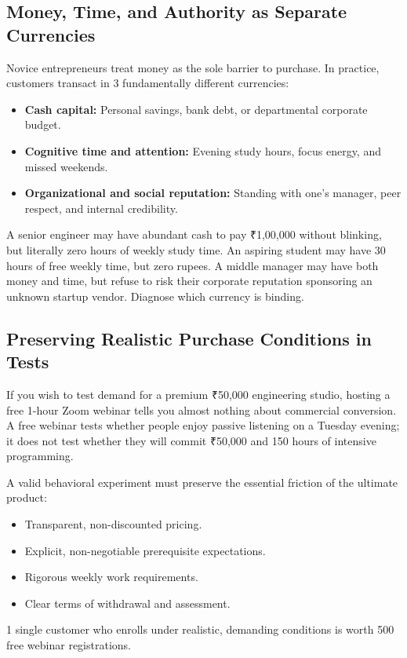 \subsection{Money, Time, and Authority as Separate Currencies}

Novice entrepreneurs treat money as the sole barrier to purchase. In practice, customers transact in 3 fundamentally different currencies:
\begin{itemize}[leftmargin=1.2em,itemsep=0.2ex]
  \item \textbf{Cash capital:} Personal savings, bank debt, or departmental corporate budget.
  \item \textbf{Cognitive time and attention:} Evening study hours, focus energy, and missed weekends.
  \item \textbf{Organizational and social reputation:} Standing with one's manager, peer respect, and internal credibility.
\end{itemize}

A senior engineer may have abundant cash to pay ₹1,00,000 without blinking, but literally zero hours of weekly study time. An aspiring student may have 30 hours of free weekly time, but zero rupees. A middle manager may have both money and time, but refuse to risk their corporate reputation sponsoring an unknown startup vendor. Diagnose which currency is binding.

\subsection{Preserving Realistic Purchase Conditions in Tests}

If you wish to test demand for a premium ₹50,000 engineering studio, hosting a free 1-hour Zoom webinar tells you almost nothing about commercial conversion. A free webinar tests whether people enjoy passive listening on a Tuesday evening; it does not test whether they will commit ₹50,000 and 150 hours of intensive programming.

A valid behavioral experiment must preserve the essential friction of the ultimate product:
\begin{itemize}[leftmargin=1.2em,itemsep=0.2ex]
  \item Transparent, non-discounted pricing.
  \item Explicit, non-negotiable prerequisite expectations.
  \item Rigorous weekly work requirements.
  \item Clear terms of withdrawal and assessment.
\end{itemize}
1 single customer who enrolls under realistic, demanding conditions is worth 500 free webinar registrations.

